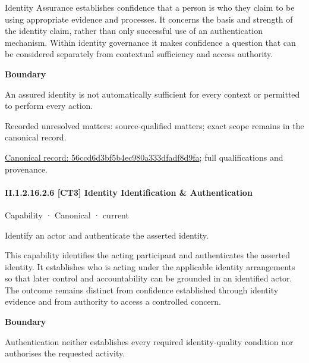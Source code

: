Identity Assurance establishes confidence that a person is who they claim to be using appropriate evidence and processes. It concerns the basis and strength of the identity claim, rather than only successful use of an authentication mechanism. Within identity governance it makes confidence a question that can be considered separately from contextual sufficiency and access authority.



\textbf{Boundary}



An assured identity is not automatically sufficient for every context or permitted to perform every action.


{\small Recorded unresolved matters: source-qualified matters; exact scope remains in the canonical record.}\par
{\footnotesize \href{../../../../../../../continuum/strategy/capability/56ccd6d3bf5b4ec980a333dfadf8d9fa.md}{Canonical record: 56ccd6d3bf5b4ec980a333dfadf8d9fa}; full qualifications and provenance.}\par
\paragraph*{II.1.2.16.2.6 [CT3] Identity Identification \& Authentication}
\label{navigation:II.1.2.16.2.6}

\label{element:ba4ad62548984d63ad75da3561566431}
{\small Capability · Canonical · current}\par

Identify an actor and authenticate the asserted identity.



This capability identifies the acting participant and authenticates the asserted identity. It establishes who is acting under the applicable identity arrangements so that later control and accountability can be grounded in an identified actor. The outcome remains distinct from confidence established through identity evidence and from authority to access a controlled concern.



\textbf{Boundary}



Authentication neither establishes every required identity-quality condition nor authorises the requested activity.


